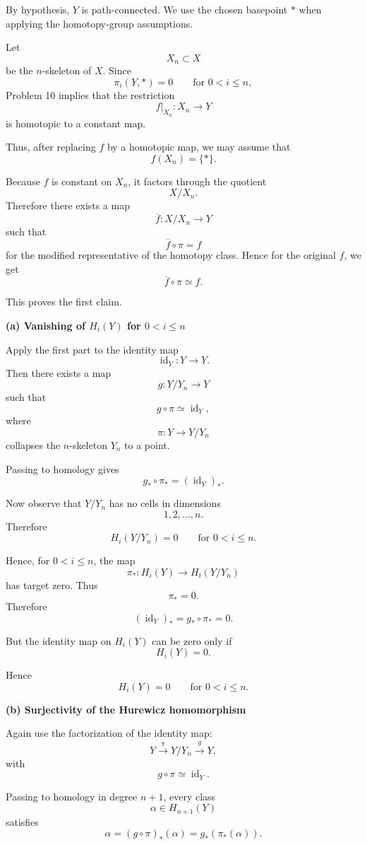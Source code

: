 \begin{solution}
By hypothesis, \(Y\) is path-connected. We use the chosen basepoint \(*\) when applying the homotopy-group assumptions.

Let
\[
X_n\subset X
\]
be the \(n\)-skeleton of \(X\). Since
\[
\pi_i(Y,*)=0
\qquad
\text{for }0<i\leq n,
\]
Problem 10 implies that the restriction
\[
f|_{X_n}:X_n\to Y
\]
is homotopic to a constant map.

Thus, after replacing \(f\) by a homotopic map, we may assume that
\[
f(X_n)=\{*\}.
\]

Because \(f\) is constant on \(X_n\), it factors through the quotient
\[
X/X_n.
\]
Therefore there exists a map
\[
\overline f:X/X_n\to Y
\]
such that
\[
\overline f\circ \pi=f
\]
for the modified representative of the homotopy class. Hence for the original \(f\), we get
\[
\boxed{
	\overline f\circ \pi\simeq f.
}
\]

This proves the first claim.


\medskip
\noindent\textbf{(a) Vanishing of \(H_i(Y)\) for \(0<i\leq n\)}\par
\smallskip


Apply the first part to the identity map
\[
\operatorname{id}_Y:Y\to Y.
\]
Then there exists a map
\[
g:Y/Y_n\to Y
\]
such that
\[
g\circ \pi\simeq \operatorname{id}_Y,
\]
where
\[
\pi:Y\to Y/Y_n
\]
collapses the \(n\)-skeleton \(Y_n\) to a point.

Passing to homology gives
\[
g_*\circ \pi_*=(\operatorname{id}_Y)_*.
\]

Now observe that \(Y/Y_n\) has no cells in dimensions
\[
1,2,\ldots,n.
\]
Therefore
\[
H_i(Y/Y_n)=0
\qquad
\text{for }0<i\leq n.
\]

Hence, for \(0<i\leq n\), the map
\[
\pi_*:H_i(Y)\to H_i(Y/Y_n)
\]
has target zero. Thus
\[
\pi_*=0.
\]
Therefore
\[
(\operatorname{id}_Y)_*
=
g_*\circ \pi_*
=
0.
\]

But the identity map on \(H_i(Y)\) can be zero only if
\[
H_i(Y)=0.
\]

Hence
\[
\boxed{
	H_i(Y)=0
	\qquad
	\text{for }0<i\leq n.
}
\]


\medskip
\noindent\textbf{(b) Surjectivity of the Hurewicz homomorphism}\par
\smallskip


Again use the factorization of the identity map:
\[
Y\xrightarrow{\pi}Y/Y_n\xrightarrow{g}Y,
\]
with
\[
g\circ \pi\simeq \operatorname{id}_Y.
\]

Passing to homology in degree \(n+1\), every class
\[
\alpha\in H_{n+1}(Y)
\]
satisfies
\[
\alpha
=
(g\circ \pi)_*(\alpha)
=
g_*(\pi_*(\alpha)).
\]


\end{solution}
